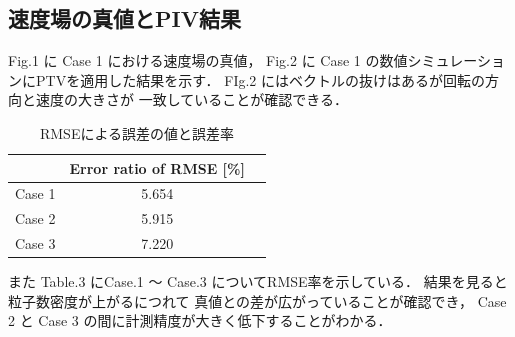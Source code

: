 \documentclass[twocolumn,a4j]{jsarticle}
\begin{document}
\newpage
\subsection{速度場の真値とPIV結果}

Fig.1 に Case 1 における速度場の真値，
Fig.2 に Case 1 の数値シミュレーションにPTVを適用した結果を示す．
FIg.2 にはベクトルの抜けはあるが回転の方向と速度の大きさが
一致していることが確認できる．

\begin{table}[hbtp]
  \label{table:data_type}
  \caption{RMSEによる誤差の値と誤差率}
  \centering
  \begin{tabular}{ c c c }
    \hline
           & Error ratio of RMSE [\%] \\ \hline \hline
    Case 1 & 5.654                    \\ \hline
    Case 2 & 5.915                    \\ \hline
    Case 3 & 7.220                    \\ \hline
  \end{tabular}
\end{table}

また Table.3 にCase.1 ～ Case.3 についてRMSE率を示している．
結果を見ると粒子数密度が上がるにつれて
真値との差が広がっていることが確認でき，
Case 2 と Case 3 の間に計測精度が大きく低下することがわかる．

\newpage
\end{document}
